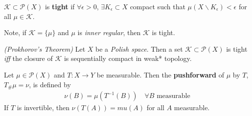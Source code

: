 \documentclass[12pt,a4paper]{article}
\begin{document}
 $\mathscr{K} \subset \mathscr{P}(X)$ is \textbf{tight} if $\forall \epsilon >0$, $\exists K_{\epsilon} \subset X$ compact such that $\mu(X \backslash K_{\epsilon}) <\epsilon$ for all $\mu \in \mathscr{K}$.

\quad Note, if $\mathscr{K} = \{\mu\}$ and $\mu$ is \emph{inner regular}, then $\mathscr{K}$ is tight. 
\s

 \emph{(Prokhorov's Theorem)} Let $X$ be a \emph{Polish space}. Then a set $\mathscr{K} \subset \mathscr{P}(X)$ is tight \textit{iff} the closure of $\mathscr{K}$ is sequentially compact in weak* topology.
\s

 Let $\mu\in \mathscr{P}(X)$ and $T: X\rightarrow Y$ be measurable. Then the \textbf{pushforward} of $\mu$ by $T$, $T_{\#} \mu = \nu$, is defined by
\begin{align*}
\nu(B) = \mu(T^{-1}(B)) \quad \forall B \text{ measurable}
\end{align*}
If $T$ is invertible, then $\nu(T(A))= mu(A)$ for all $A$ measurable.
\s
\end{document}
